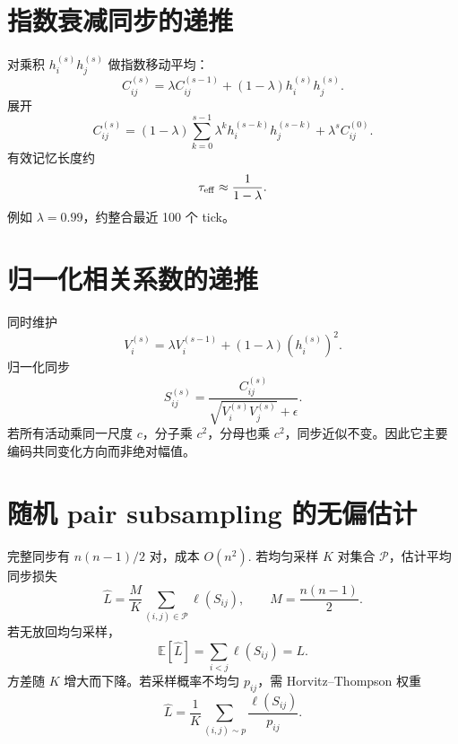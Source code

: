 \documentclass[UTF8,12pt,a4paper,fontset=none]{ctexart}
\numberwithin{equation}{section}
\newcommand{\E}{\mathbb{E}}
\begin{document}
\section{指数衰减同步的递推}
对乘积 $h_i^{(s)}h_j^{(s)}$ 做指数移动平均：
\begin{equation}
 C_{ij}^{(s)}=\lambda C_{ij}^{(s-1)}
 +(1-\lambda)h_i^{(s)}h_j^{(s)}.
\end{equation}
展开
\begin{equation}
 C_{ij}^{(s)}=(1-\lambda)
 \sum_{k=0}^{s-1}\lambda^k
 h_i^{(s-k)}h_j^{(s-k)}+
 \lambda^sC_{ij}^{(0)}.
\end{equation}
有效记忆长度约
\begin{equation}
 \tau_{\rm eff}\approx\frac1{1-\lambda}.
\end{equation}
例如 $\lambda=0.99$，约整合最近 100 个 tick。

\section{归一化相关系数的递推}
同时维护
\begin{equation}
 V_i^{(s)}=\lambda V_i^{(s-1)}
 +(1-\lambda)(h_i^{(s)})^2.
\end{equation}
归一化同步
\begin{equation}
 S_{ij}^{(s)}=\frac{C_{ij}^{(s)}}
 {\sqrt{V_i^{(s)}V_j^{(s)}}+\epsilon}.
\end{equation}
若所有活动乘同一尺度 $c$，分子乘 $c^2$，分母也乘 $c^2$，同步近似不变。因此它主要编码共同变化方向而非绝对幅值。

\section{随机 pair subsampling 的无偏估计}
完整同步有 $n(n-1)/2$ 对，成本 $O(n^2)$. 若均匀采样 $K$ 对集合 $\mathcal P$，估计平均同步损失
\begin{equation}
 \widehat L=\frac{M}{K}
 \sum_{(i,j)\in\mathcal P}\ell(S_{ij}),
 \qquad M=\frac{n(n-1)}2.
\end{equation}
若无放回均匀采样，
\begin{equation}
 \E[\widehat L]=
 \sum_{i<j}\ell(S_{ij})=L.
\end{equation}
方差随 $K$ 增大而下降。若采样概率不均匀 $p_{ij}$，需 Horvitz--Thompson 权重
\begin{equation}
 \widehat L=\frac1K\sum_{(i,j)\sim p}
 \frac{\ell(S_{ij})}{p_{ij}}.
\end{equation}
\end{document}
